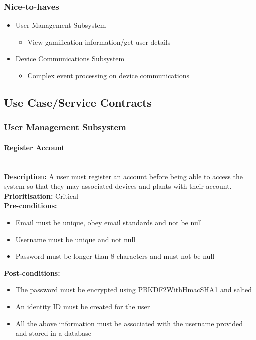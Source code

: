 \documentclass{article}
\begin{document}
		\subsubsection{Nice-to-haves}
			\begin{itemize}
				\item User Management Subsystem
					\begin{itemize}
						\item View gamification information/get user details
					\end{itemize}
				\item Device Communications Subsystem
					\begin{itemize}
						\item Complex event processing on device communications
					\end{itemize}
			\end{itemize}

\subsection{Use Case/Service Contracts}

\subsubsection{User Management Subsystem}
	\paragraph{Register Account}\mbox{}\\
		\textbf{Description:} A user must register an account before being able to access the system so that they may associated devices and plants with their account.\\
		\textbf{Prioritisation:} Critical\\		
		\textbf{Pre-conditions:}
			\begin{itemize}
				\item Email must be unique, obey email standards and not be null
				\item Username must be unique and not null
				\item Password must be longer than 8 characters and must not be null
			\end{itemize}
		\textbf{Post-conditions:}
			\begin{itemize}
				\item The password must be encrypted using PBKDF2WithHmacSHA1 and salted
				\item An identity ID must be created for the user
				\item All the above information must be associated with the username provided and stored in a database
			\end{itemize}
\end{document}
